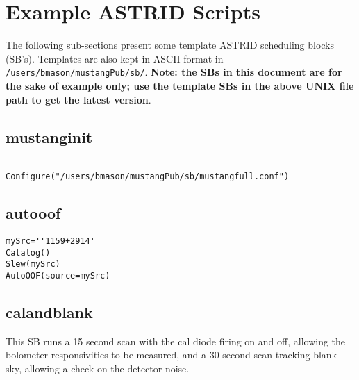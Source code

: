 \newpage

\section{Example ASTRID Scripts}\label{sec:musastridscripts}

The following sub-sections present some template ASTRID scheduling
blocks (SB's).  Templates are also kept in ASCII format in {\tt
/users/bmason/mustangPub/sb/}.  {\bf Note: the SBs in this document
are for the sake of example only; use the template SBs in the above
UNIX file path to get the latest version}.

\subsection{mustanginit}
\begin{lstlisting}

Configure("/users/bmason/mustangPub/sb/mustangfull.conf")

\end{lstlisting}

\subsection{autooof}

\begin{lstlisting}
mySrc=''1159+2914'
Catalog()
Slew(mySrc)
AutoOOF(source=mySrc)
\end{lstlisting}


\subsection{calandblank}

This SB runs a 15 second scan with the cal diode firing on and off,
allowing the bolometer responsivities to be measured, and a 30 second
scan tracking blank sky, allowing a check on the detector noise.


